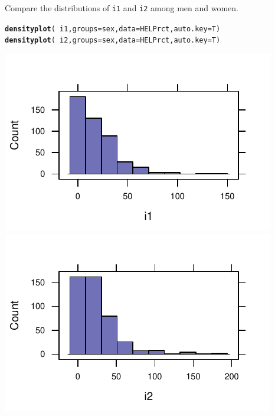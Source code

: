 \documentclass[twoside]{book}\usepackage[]{graphicx}\usepackage[]{xcolor}
\makeatletter
\def\maxwidth{ %
  \ifdim\Gin@nat@width>\linewidth
    \linewidth
  \else
    \Gin@nat@width
  \fi
}
\newcommand{\hlopt}[1]{\textcolor[rgb]{0,0,0}{#1}}%
\newcommand{\hlstd}[1]{\textcolor[rgb]{0.345,0.345,0.345}{#1}}%
\newcommand{\hlkwc}[1]{\textcolor[rgb]{0.333,0.667,0.333}{#1}}%
\newcommand{\hlkwd}[1]{\textcolor[rgb]{0.737,0.353,0.396}{\textbf{#1}}}%
\newenvironment{kframe}{%
 \def\at@end@of@kframe{}%
 \ifinner\ifhmode%
  \def\at@end@of@kframe{\end{minipage}}%
  \begin{minipage}{\columnwidth}%
 \fi\fi%
 \def\FrameCommand##1{\hskip\@totalleftmargin \hskip-\fboxsep
 \colorbox{shadecolor}{##1}\hskip-\fboxsep
     \hskip-\linewidth \hskip-\@totalleftmargin \hskip\columnwidth}%
 \MakeFramed {\advance\hsize-\width
   \@totalleftmargin\z@ \linewidth\hsize
   \@setminipage}}%
 {\par\unskip\endMakeFramed%
 \at@end@of@kframe}
\newenvironment{knitrout}{}{} %
\newcommand{\variable}[1]{{\color{green!50!black}\texttt{#1}}}
\makeatother
\begin{document}
\begin{problem}
	Compare the distributions of \variable{i1} and \variable{i2} among men
	and women.
\end{problem}
\begin{solution}
\begin{knitrout}
\color{fgcolor}\begin{kframe}
\begin{alltt}
\hlkwd{densityplot}\hlstd{(} \hlopt{~}\hlstd{i1,} \hlkwc{groups}\hlstd{=sex,} \hlkwc{data}\hlstd{=HELPrct ,} \hlkwc{auto.key}\hlstd{=T)}
\hlkwd{densityplot}\hlstd{(} \hlopt{~}\hlstd{i2,} \hlkwc{groups}\hlstd{=sex,} \hlkwc{data}\hlstd{=HELPrct ,} \hlkwc{auto.key}\hlstd{=T)}
\end{alltt}
\end{kframe}

{\centering \includegraphics[width=\maxwidth]{figures/fig-unnamed-chunk-34-1} 
\includegraphics[width=\maxwidth]{figures/fig-unnamed-chunk-34-2} 

}
\end{knitrout}
\end{solution}
\end{document}
